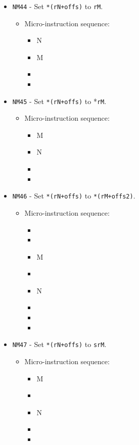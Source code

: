 \documentclass{article}
\begin{document}
\begin{itemize}
    \item \Verb|NM44| - Set \Verb|*(rN+offs)| to \Verb|rM|.
    \begin{itemize}
        \item Micro-instruction sequence:
        \begin{itemize}
            \item \regtoaddr N
            \item \regtodata M
            \item \writeRAM
            \item \done
        \end{itemize}
    \end{itemize}

    \item \Verb|NM45| - Set \Verb|*(rN+offs)| to *\Verb|rM|.
    \begin{itemize}
        \item Micro-instruction sequence:
        \begin{itemize}
            \item \regtoaddr M
            \item \regtodata N
            \item \writeRAM
            \item \done
        \end{itemize}
    \end{itemize}

    \item \Verb|NM46| - Set \Verb|*(rN+offs)| to \Verb|*(rM+offs2)|.
    \begin{itemize}
        \item Micro-instruction sequence:
        \begin{itemize}
            \item \pkptroutinc
            \item \datatooffs
            \item \regptodatao M
            \item \holddata
            \item \regtoaddr N
            \item \writeRAM
            \item \incrementpk
            \item \done
        \end{itemize}
    \end{itemize}
    
    \item \Verb|NM47| - Set \Verb|*(rN+offs)| to \Verb|srM|.
    \begin{itemize}
        \item Micro-instruction sequence:
        \begin{itemize}
            \item \specialtodata M
            \item \holddata
            \item \regtoaddr N
            \item \writeRAM
            \item \done
        \end{itemize}
    \end{itemize}


\end{itemize}
\end{document}
